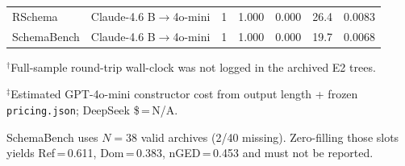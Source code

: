 \begin{table}[t]
\begin{tabular}{@{}l l c c c c c@{}}
RSchema & Claude-4.6 B$\rightarrow$4o-mini & 1 & 1.000 & 0.000 & 26.4 & 0.0083 \\
SchemaBench & Claude-4.6 B$\rightarrow$4o-mini & 1 & 1.000 & 0.000 & 19.7 & 0.0068 \\
\bottomrule
\end{tabular}
\begin{tablenotes}
\footnotesize
\item $^{\dagger}$Full-sample round-trip wall-clock was not logged in the archived E2 trees.
\item $^{\ddagger}$Estimated GPT-4o-mini constructor cost from output length + frozen \texttt{pricing.json}; DeepSeek \$\,=\,N/A.
\item SchemaBench uses $N{=}38$ valid archives (2/40 missing). Zero-filling those slots yields Ref\,=\,0.611, Dom\,=\,0.383, nGED\,=\,0.453 and must not be reported.
\end{tablenotes}
\end{table}
